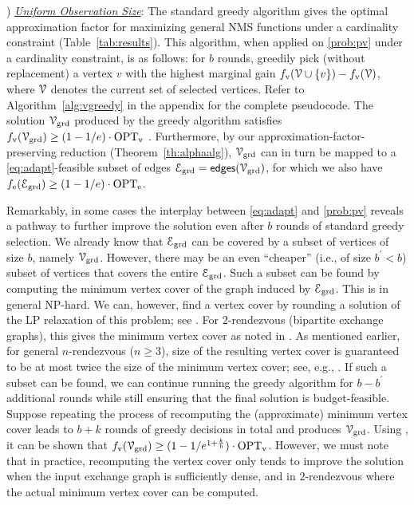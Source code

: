 \documentclass[conference]{IEEEtran}
\begin{document}
) \underline{\it Uniform Observation Size}:
The standard greedy algorithm gives the optimal approximation factor for
maximizing general NMS functions under a cardinality constraint (Table~\ref{tab:results}). This algorithm, when applied on \ref{prob:pv} under
a cardinality constraint, is as follows: for $b$ rounds, greedily pick (without
replacement) a vertex $v$
with the highest marginal gain $f_\text{v}(\mathcal{V} \cup \{v\}) - f_\text{v}(\mathcal{V})$, where
$\mathcal{V}$ denotes the current set of selected vertices. 
Refer to Algorithm~\ref{alg:vgreedy} in the appendix for the complete pseudocode.
The solution $\mathcal{V}_\text{grd}$ produced by the greedy algorithm satisfies 
$f_\text{v}(\mathcal{V}_\text{grd}) \geq (1-1/e)\cdot\mathrm{OPT}_\text{v}$ \cite{nemhauser1978analysis}.
Furthermore, by our approximation-factor-preserving reduction (Theorem~\ref{th:alphaalg}), 
$\mathcal{V}_\text{grd}$ can in 
turn be mapped to a \ref{eq:adapt}-feasible subset of edges $\mathcal{E}_\text{grd} = \mathsf{edges}(\mathcal{V}_\text{grd})$, for which we also have
$f_\text{e}(\mathcal{E}_\text{grd}) \geq (1-1/e)\cdot\mathrm{OPT}_\text{e}$. 


Remarkably, in some cases the interplay between \ref{eq:adapt} and \ref{prob:pv} reveals a pathway to further improve the solution 
even after $b$ rounds of standard greedy selection. 
We already know that $\mathcal{E}_\text{grd}$ can be covered by
a subset of vertices of size $b$, namely $\mathcal{V}_\text{grd}$. However,
there may be an even ``cheaper'' (i.e., of size $b^\prime < b$) subset of vertices that covers the entire
$\mathcal{E}_\text{grd}$. 
Such a subset can be found by computing the minimum vertex cover of the graph induced by
$\mathcal{E}_\text{grd}$. 
This is in general NP-hard.
We can, however, find a vertex cover by rounding a solution of the LP relaxation of this problem; see \cite{vazirani2013approximation}. For
$2$-rendezvous (bipartite exchange graphs), this gives the minimum vertex cover
as noted in \cite{Giamou18_ICRA}. As mentioned earlier, for general
\mbox{$n$-rendezvous} ($n\geq 3$), size of the resulting vertex cover is guaranteed to be at most
twice the size of the minimum vertex cover; see,
e.g., \cite{vazirani2013approximation}.
If such a subset can be found, we can continue running the greedy algorithm for
$b-b^\prime$ additional rounds while still ensuring that the final solution is
budget-feasible.  Suppose repeating the process of recomputing the
(approximate) minimum vertex cover leads to $b+k$ rounds of greedy
decisions in total and produces $\mathcal{V}_\text{grd}$. 
Using \cite[Theorem 1.5]{krauseSurvey}, it can be shown that 
$f_\text{v}(\mathcal{V}_\text{grd}) \geq (1-1/e^{1+\frac{k}{b}}) \cdot \mathrm{OPT}_\text{v}$.
However, we must note that in practice, recomputing the vertex cover only tends to
improve the solution when the input exchange graph is sufficiently dense, and in
$2$-rendezvous where the actual
minimum vertex cover can be computed.
\end{document}
